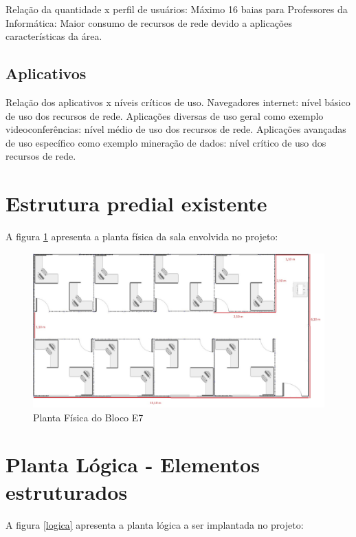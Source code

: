 \documentclass[	DIV=calc,
							paper=a4,
							fontsize=12pt,
							onecolumn]{scrartcl}
\begin{document}
Relação da quantidade x perfil de usuários:
Máximo 16 baias para Professores da Informática: Maior consumo de recursos de rede devido a aplicações características da área.

\subsection{Aplicativos}
Relação dos aplicativos x níveis críticos de uso.
Navegadores internet: nível básico de uso dos recursos de rede.
Aplicações diversas de uso geral como exemplo videoconferências: nível médio de uso dos recursos de rede.
Aplicações avançadas de uso específico como exemplo mineração de dados: nível crítico de uso dos recursos de rede.

\section{Estrutura predial existente}

A figura \ref{fisica} apresenta a planta física da sala envolvida no projeto:

\begin{figure}
	\centering
	\includegraphics{fisica.jpg}
	\caption{Planta Física do Bloco E7}
	\label{fisica}
\end{figure}

\section{Planta Lógica - Elementos estruturados}

A figura \ref{logica} apresenta a planta lógica a ser implantada no projeto:
\end{document}
